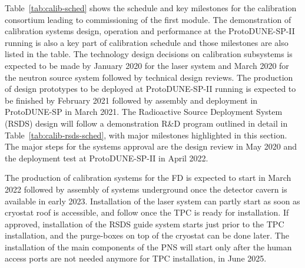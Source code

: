 

Table~\ref{tab:calib-sched} shows the schedule and key milestones for the calibration consortium leading to commissioning of the first  module. The demonstration of calibration systems design, operation and performance at the ProtoDUNE-SP-II running is also a key part of calibration schedule and those milestones are also listed in the table. The technology design decisions on calibration subsystems is expected to be made by January 2020 for the laser system and March 2020 for the neutron source system followed by technical design reviews. The production of design prototypes to be deployed at ProtoDUNE-SP-II running is expected to be finished by February 2021 followed by assembly and deployment in ProtoDUNE-SP in March 2021. The Radioactive Source Deployment System (RSDS) design will follow a demonstration R\&D program outlined in detail in Table~\ref{tab:calib-rsds-sched}, with major milestones highlighted in this section. The major steps for the systems approval are the design review in May 2020 and the deployment test at ProtoDUNE-SP-II in April 2022. 

The production of calibration systems for the FD is expected to start in March 2022 followed by assembly of systems underground once the detector cavern is available in early 2023. Installation of the laser system can partly start as soon as cryostat roof is accessible, and follow once the TPC is ready for installation. If approved, installation of the RSDS guide system starts just prior to the TPC installation, and the purge-boxes on top of the cryostat can be done later.
The installation of the main components of the PNS will start only after the human access ports are not needed anymore for TPC installation, in June 2025. 



